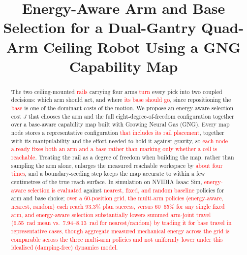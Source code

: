 \documentclass[conference]{IEEEtran}
\newcommand{\TODO}[1]{\textcolor{red}{[TODO: #1]}}
\begin{document}
\title{Energy-Aware Arm and Base Selection for a Dual-Gantry Quad-Arm Ceiling Robot Using a GNG Capability Map}

\author{
\IEEEauthorblockN{1\textsuperscript{st} \TODO{Given Name Surname}}
\IEEEauthorblockA{\textit{\TODO{dept. name of organization}} \\
\textit{\TODO{name of organization}}\\
\TODO{City, Country} \\
\TODO{email address or ORCID}}
}

\maketitle

\begin{abstract}
The two ceiling-mounted \textcolor{red}{rails} carrying four arms \textcolor{red}{turn} every pick into two coupled decisions:
which arm should act, and where \textcolor{red}{its base should go}, since repositioning the
\textcolor{red}{base} is one of the dominant costs of the motion. We propose an energy-aware
selection cost $J$ that chooses the arm and the full eight-degree-of-freedom
configuration together over a base-aware capability map built with Growing Neural
Gas (GNG). Every map node stores a representative configuration \textcolor{red}{that includes its rail placement}, together with its
manipulability and the effort needed to hold it against gravity, so \textcolor{red}{each node already fixes both an arm and a base rather than marking only whether a cell is reachable}. Treating the rail as a
degree of freedom when building the map, rather than sampling the arm alone, enlarges
the measured reachable workspace by \textcolor{red}{about four times}, and a boundary-seeding step
keeps the map accurate to within a few centimetres of the true reach surface. In
simulation on NVIDIA Isaac Sim, \textcolor{red}{energy-aware
selection is evaluated} against \textcolor{red}{nearest, fixed, and random baseline} policies for
arm and base choice; \textcolor{red}{over a 60-position grid, the multi-arm policies
(energy-aware, nearest, random) each reach 93.3\% plan success, versus 60--65\% for
any single fixed arm, and energy-aware selection substantially lowers summed
arm-joint travel (6.55~rad mean vs.\ 7.94--8.13~rad for nearest/random) by trading
it for base travel in representative cases, though aggregate measured mechanical
energy across the grid is comparable across the three multi-arm policies and not
uniformly lower under this idealised (damping-free) dynamics model}.
\end{abstract}
\end{document}
